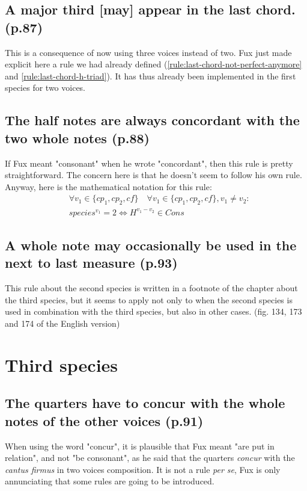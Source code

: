 \subsection{A major third [may] appear in the last chord. (p.87)}
This is a consequence of now using three voices instead of two. Fux just made explicit here a rule we had already defined (\ref{rule:last-chord-not-perfect-anymore} and \ref{rule:last-chord-h-triad}). It has thus already been implemented in the first species for two voices.

\subsection{The half notes are always concordant with the two whole notes (p.88)}
If Fux meant "consonant" when he wrote "concordant", then this rule is pretty straightforward. The concern here is that he doesn't seem to follow his own rule. Anyway, here is the mathematical notation for this rule:
\begin{equation} \begin{aligned}
    &\forall v_1 \in \{cp_1, cp_2, cf\} \quad \forall v_1 \in \{cp_1, cp_2, cf\}, v_1 \neq v_2 \colon\\
    &species^{v_1} = 2 \iff H^{v_1-v_2} \in Cons
\end{aligned} \end{equation}

\subsection{A whole note may occasionally be used in the next to last measure (p.93)}
This rule about the second species is written in a footnote of the chapter about the third species, but it seems to apply not only to when the second species is used in combination with the third species, but also in other cases. (fig. 134, 173 and 174 of the English version)

\section{Third species}
\subsection{The quarters have to concur with the whole notes of the other voices (p.91)}
When using the word "concur", it is plausible that Fux meant "are put in relation", and not "be consonant", as he said that the quarters \textit{concur} with the \textit{cantus firmus} in two voices composition. It is not a rule \textit{per se}, Fux is only annunciating that some rules are going to be introduced.

